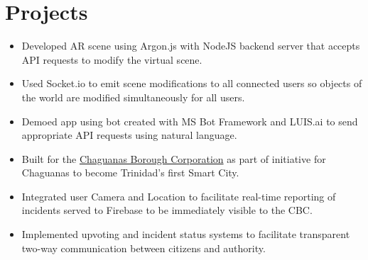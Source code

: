 \documentclass{resume}
\newcommand{\present}{$\rightarrow$}
\begin{document}
\begin{minipage}[t]{0.66\linewidth}
\section{Projects}
\begin{itemize}
    \item Developed AR scene using Argon.js with NodeJS backend server that accepts API requests to modify the virtual scene.
    \item Used Socket.io to emit scene modifications to all connected users so objects of the world are modified simultaneously for all users.
    \item Demoed app using bot created with MS Bot Framework and LUIS.ai to send appropriate API requests using natural language.
\end{itemize}
\begin{itemize}
    \item Built for the \href{http://chaguanasborough.com/}{Chaguanas Borough Corporation} as part of initiative for Chaguanas to become Trinidad's first Smart City.
    \item Integrated user Camera and Location to facilitate real-time reporting of incidents served to Firebase to be immediately visible to the CBC.
    \item Implemented upvoting and incident status systems to facilitate transparent two-way communication between citizens and authority.
\end{itemize}

\end{minipage}
\end{document}
